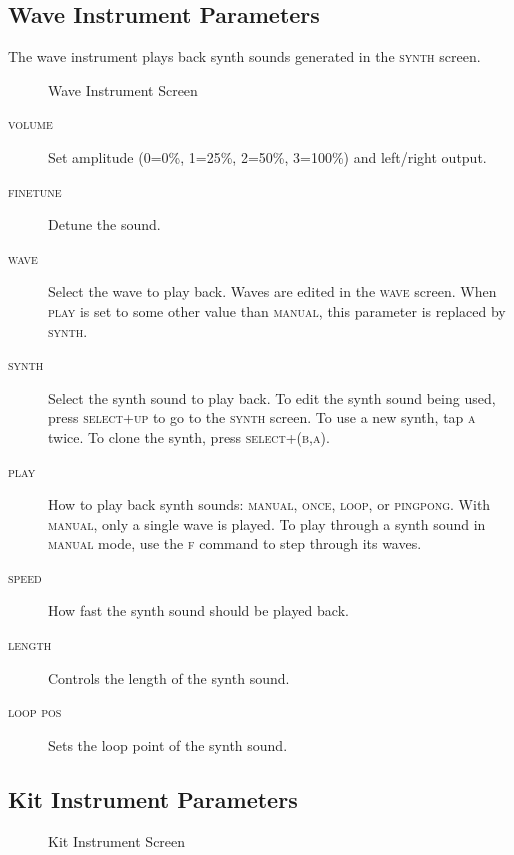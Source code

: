 \subsection{Wave Instrument Parameters}

The wave instrument plays back synth sounds generated in the \textsc{synth} screen.

\begin{figure}[hbtp]
	\begin{center}
	\end{center}
	\caption{Wave Instrument Screen}
\end{figure}

\begin{description}
    \item[\textsc{volume}] Set amplitude (0=0\%, 1=25\%, 2=50\%, 3=100\%) and left/right output.
    \item[\textsc{finetune}] Detune the sound.
    \item[\textsc{wave}] Select the wave to play back. Waves are edited in the \textsc{wave} screen. When \textsc{play} is set to some other value than \textsc{manual}, this parameter is replaced by \textsc{synth}.
    \item[\textsc{synth}] Select the synth sound to play back. To edit the synth sound being used, press \textsc{select+up} to go to the \textsc{synth} screen. To use a new synth, tap \textsc{a} twice. To clone the synth, press \textsc{select+(b,a)}.
    \item[\textsc{play}] How to play back synth sounds: \textsc{manual}, \textsc{once}, \textsc{loop}, or \textsc{pingpong}. With \textsc{manual}, only a single wave is played. To play through a synth sound in \textsc{manual} mode, use the \textsc{f} command to step through its waves.
	\item[\textsc{speed}] How fast the synth sound should be played back.
	\item[\textsc{length}] Controls the length of the synth sound.
	\item[\textsc{loop pos}] Sets the loop point of the synth sound.
\end{description}

\subsection{Kit Instrument Parameters}

\begin{figure}[hbtp]
	\begin{center}
	\end{center}
	\caption{Kit Instrument Screen}
\end{figure}

